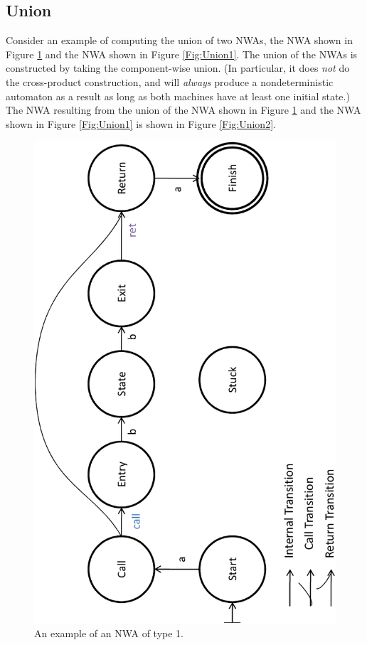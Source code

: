\subsection{Union}
\label{Se:Union}
Consider an example of computing the union of two NWAs, the NWA shown in
Figure \ref{Fig:Example1} and the NWA shown in Figure \ref{Fig:Union1}.  The
union of the NWAs is constructed by taking the component-wise union. (In
particular, it does \textsl{not} do the cross-product construction, and will
\textsl{always} produce a nondeterministic automaton as a result as long as
both machines have at least one initial state.)
The NWA resulting from the union of the
NWA shown in Figure \ref{Fig:Example1} and the NWA shown in Figure
\ref{Fig:Union1} is shown in Figure \ref{Fig:Union2}.

\begin{figure}[htb]
  \centering
    \includegraphics[width=12cm]{Figures/Figure1}
  \caption{An example of an NWA of type 1.}
  \label{Fig:Example1}
\end{figure}



